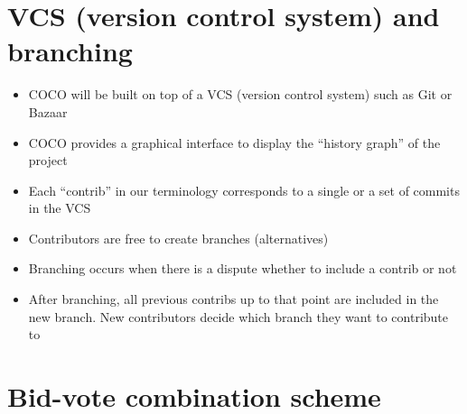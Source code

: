 \documentclass[12pt, orivec]{article}
\begin{document}
\secttoc
\section{VCS (version control system) and branching}

\begin{itemize}
	\item COCO will be built on top of a VCS (version control system) such as Git or Bazaar
	
	\item COCO provides a graphical interface to display the ``history graph'' of the project
	
	\item Each ``contrib'' in our terminology corresponds to a single or a set of commits in the VCS
	
	\item Contributors are free to create branches (alternatives)

	\item Branching occurs when there is a dispute whether to include a contrib or not

	\item After branching, all previous contribs up to that point are included in the new branch.  New contributors decide which branch they want to contribute to
\end{itemize}

\secttoc
\section{Bid-vote combination scheme}
\end{document}
